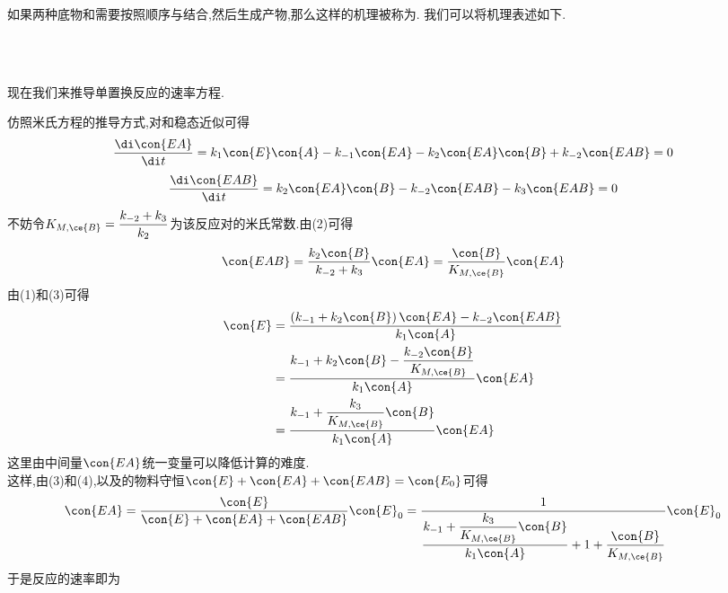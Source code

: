 \documentclass{ctexart}
\begin{document}
\indent 如果两种底物和需要按照顺序与结合,然后生成产物,那么这样的机理被称为.%
我们可以将机理表述如下.
\begin{tightcenter}
    \\
    \\
\end{tightcenter}
现在我们来推导单置换反应的速率方程.
\begin{derivation}\setcounter{equation}{0}
    仿照米氏方程的推导方式,对和稳态近似可得
    \begin{equation}
        \dfrac{\di\con{EA}}{\di t}=k_1\con{E}\con{A}-k_{-1}\con{EA}-k_2\con{EA}\con{B}+k_{-2}\con{EAB}=0
    \end{equation}
    \begin{equation}
        \dfrac{\di\con{EAB}}{\di t}=k_2\con{EA}\con{B}-k_{-2}\con{EAB}-k_3\con{EAB}=0
    \end{equation}
    不妨令$K_{M,\ce{B}}=\dfrac{k_{-2}+k_3}{k_2}$为该反应对的米氏常数.由(2)可得
    \begin{equation}
        \con{EAB}=\dfrac{k_2\con{B}}{k_{-2}+k_3}\con{EA}=\dfrac{\con{B}}{K_{M,\ce{B}}}\con{EA}
    \end{equation}
    由(1)和(3)可得
    \begin{equation}
        \begin{aligned}
            \con{E}
            &= \dfrac{\left(k_{-1}+k_2\con{B}\right)\con{EA}-k_{-2}\con{EAB}}{k_1\con{A}} \\
            &= \dfrac{k_{-1}+k_2\con{B}-\dfrac{k_{-2}\con{B}}{K_{M,\ce{B}}}}{k_1\con{A}}\con{EA} \\
            &= \dfrac{k_{-1}+\dfrac{k_3}{K_{M,\ce{B}}}\con{B}}{k_1\con{A}}\con{EA}
        \end{aligned}
    \end{equation}
    这里由中间量$\con{EA}$统一变量可以降低计算的难度.\\
    这样,由(3)和(4),以及的物料守恒$\con{E}+\con{EA}+\con{EAB}=\con{E_0}$可得
    \begin{equation}
        \con{EA}
        =\dfrac{\con{E}}{\con{E}+\con{EA}+\con{EAB}}\con{E}_0
        =\dfrac{1}{\dfrac{k_{-1}+\dfrac{k_3}{K_{M,\ce{B}}}\con{B}}{k_1\con{A}}+1+\dfrac{\con{B}}{K_{M,\ce{B}}}}\con{E}_0
    \end{equation}
    于是反应的速率即为
    \begin{equation}
        \begin{aligned}

\end{aligned}
\end{equation}
\end{derivation}
\end{document}

